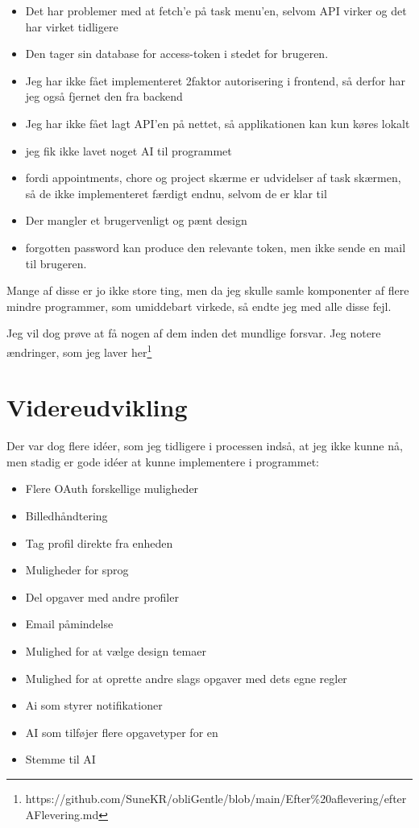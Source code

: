 \documentclass{report}
\begin{document}
\begin{itemize}
\item Det har problemer med at fetch'e på task menu'en, selvom API virker og det har virket tidligere
\item Den tager sin database for access-token i stedet for brugeren.
\item Jeg har ikke fået implementeret 2faktor autorisering i frontend, så derfor har jeg også fjernet den fra backend
\item Jeg har ikke fået lagt API'en på nettet, så applikationen kan kun køres lokalt
\item jeg fik ikke lavet noget AI til programmet
\item fordi appointments, chore og project skærme er udvidelser af task skærmen, så de ikke implementeret færdigt endnu, selvom de er klar til
\item Der mangler et brugervenligt og pænt design
\item forgotten password kan produce den relevante token, men ikke sende en mail til brugeren.
\end{itemize}

Mange af disse er jo ikke store ting, men da jeg skulle samle komponenter af flere mindre programmer, som umiddebart virkede, så endte jeg med alle disse fejl.

Jeg vil dog prøve at få nogen af dem inden det mundlige forsvar. Jeg notere ændringer, som jeg laver her\footnote{https://github.com/SuneKR/obliGentle/blob/main/Efter\%20aflevering/efterAFlevering.md}

\section{Videreudvikling}

Der var dog flere idéer, som jeg tidligere i processen indså, at jeg ikke kunne nå, men stadig er gode idéer at kunne implementere i programmet:

\begin{itemize}
\item Flere OAuth forskellige muligheder
\item Billedhåndtering
\item Tag profil direkte fra enheden
\item Muligheder for sprog
\item Del opgaver med andre profiler
\item Email påmindelse
\item Mulighed for at vælge design temaer
\item Mulighed for at oprette andre slags opgaver med dets egne regler
\item Ai som styrer notifikationer
\item AI som tilføjer flere opgavetyper for en
\item Stemme til AI
\end{itemize}
\end{document}
